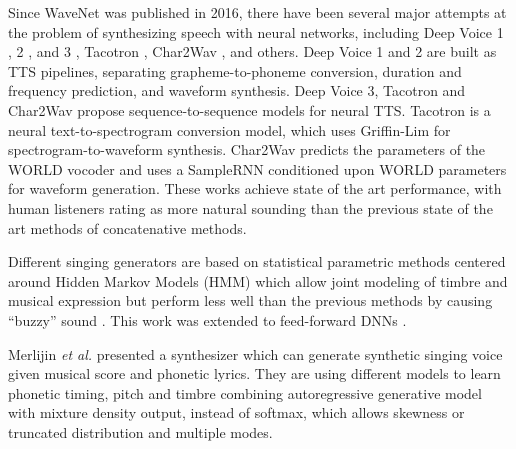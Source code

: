 \documentclass{article}
\begin{document}
Since WaveNet was published in 2016, there have been several major attempts at the problem of synthesizing speech with neural networks, including Deep Voice 1 \cite{arik2017deep}, 2 \cite{arik2017deep2}, and 3 \cite{ping2018deep}, Tacotron \cite{wang2017tacotron}, Char2Wav \cite{sotelo2017char2wav}, and others. Deep Voice 1 and 2 are built as TTS pipelines, separating grapheme-to-phoneme conversion, duration and frequency prediction, and waveform synthesis. Deep Voice 3, Tacotron and Char2Wav propose sequence-to-sequence models for neural TTS. Tacotron is a neural text-to-spectrogram conversion model, which uses Griffin-Lim \cite{griffin1984signal} for spectrogram-to-waveform synthesis. Char2Wav predicts the parameters of the WORLD vocoder \cite{morise2016world} and uses a SampleRNN \cite{mehri2016samplernn} conditioned upon WORLD parameters for waveform generation.
These works achieve state of the art performance, with human listeners rating as more natural sounding than the previous state of the art methods of concatenative methods.

Different singing generators are based on statistical parametric methods centered around Hidden Markov Models (HMM) which allow joint modeling of timbre and musical expression but perform less well than the previous methods by causing “buzzy” sound \cite{oura2012pitch}.
This work was extended to feed-forward DNNs \cite{nishimura2016singing}.

Merlijin {\em et al.} \cite{blaauw2017neural} presented a synthesizer which can generate synthetic singing voice given musical score and phonetic lyrics. They are using different models to learn phonetic timing, pitch and timbre combining autoregressive generative model with mixture density output, instead of softmax, which allows skewness or truncated distribution and multiple modes.
\end{document}
